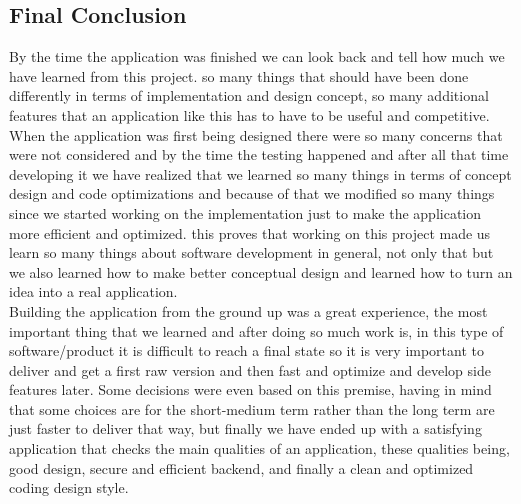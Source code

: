 \begin{center}
    \section*{\huge{Final Conclusion}}
\end{center}
By the time the application was finished we can look back and tell how much we have learned from this project. so many things that should have been done differently in terms of implementation and design concept, so many additional features that an application like this has to have to be useful and competitive. 
\\ When the application was first being designed there were so many concerns that were not considered and by the time the testing happened and after all that time developing it we have realized that we learned so many things in terms of concept design and code optimizations and because of that we modified so many things since we started working on the implementation just to make the application more efficient and optimized. this proves that working on this project made us learn so many things about software development in general, not only that but we also learned how to make better conceptual design and learned how to turn an idea into a real application.
\\ Building the application from the ground up was a great experience, the most important thing that we learned and after doing so much work is, in this type of software/product it is difficult  to reach a final state so it is very important to deliver and get a first raw version and then fast and optimize and develop side features later. Some decisions were even based on this premise, having in mind that some choices are for the short-medium term rather than the long term are just faster to deliver that way, but finally we have ended up with a satisfying application that checks the main qualities of an application, these qualities being, good design, secure and efficient backend, and finally a clean and optimized coding design style. 



